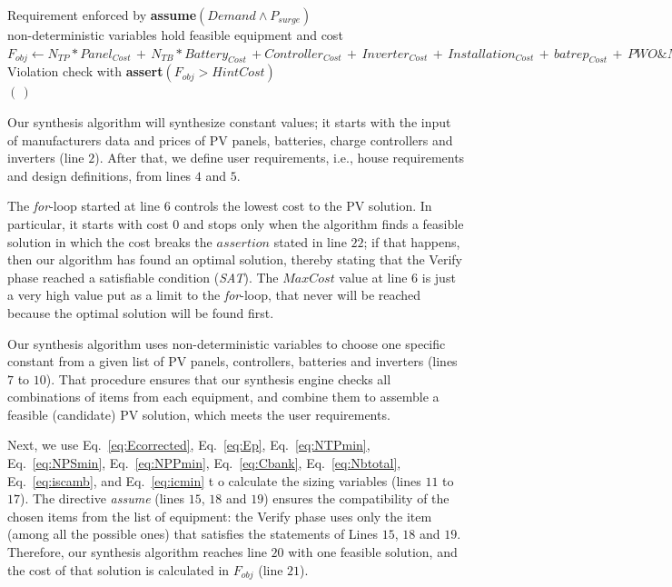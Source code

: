 \documentclass[review]{elsarticle}
\begin{document}
\begin{algorithm}
\begin{algorithmic}[1]
	\STATE Requirement enforced by \textbf{assume}$(Demand \wedge P_{surge})$ \\
	\STATE non-deterministic variables hold feasible equipment and cost  \\
	\STATE $F_{obj} \leftarrow  N_{TP}*Panel_{Cost} \, + \, N_{TB}*Battery_{Cost} \, + Controller_{Cost} \, + \, Inverter_{Cost} \, + \, Installation_{Cost} \, + \, batrep_{Cost} \, + \, PWO\&M_{Cost}$ \\
	\STATE Violation check with \textbf{assert}$(F_{obj} > HintCost)$ \\
  \ENDFOR
 \RETURN $(\,)$ 
 \end{algorithmic} 
 \label{alg:verification-algorithm}
 \end{algorithm}
%

Our synthesis algorithm will synthesize constant values; 
it starts with the input of manufacturers data and prices of PV panels, batteries, 
charge controllers and inverters (line $2$). After that, we define user requirements, i.e., 
house requirements and design definitions, from lines $4$ and $5$. 

The \textit{for}-loop started at line $6$ controls the lowest cost to the PV solution. 
In particular, it starts with cost $0$ and stops only when the algorithm finds a 
feasible solution in which the cost breaks the $assertion$ stated in line $22$; 
if that happens, then our algorithm has found an optimal solution, thereby stating 
that the {\sc Verify} phase reached a satisfiable condition (\textit{SAT}). 
The $MaxCost$ value at line $6$ is just a very high value put as a limit 
to the \textit{for}-loop, that never will be reached because the optimal solution will be found first.

Our synthesis algorithm uses non-deterministic variables to choose one specific constant 
from a given list of PV panels, controllers, batteries and inverters (lines $7$ to $10$). 
That procedure ensures that our synthesis engine checks all combinations of items 
from each equipment, and combine them to assemble a feasible (candidate) PV solution, 
which meets the user requirements.

Next, we use Eq.~\eqref{eq:Ecorrected}, Eq.~\eqref{eq:Ep}, Eq.~\eqref{eq:NTPmin}, 
Eq.~\eqref{eq:NPSmin}, Eq.~\eqref{eq:NPPmin}, Eq.~\eqref{eq:Cbank}, 
Eq.~\eqref{eq:Nbtotal}, Eq.~\eqref{eq:iscamb}, and Eq.~\eqref{eq:icmin} t
o calculate the sizing variables (lines $11$ to $17$). The directive \textit{assume} (lines $15$, $18$ and $19$) 
ensures the compatibility of the chosen items from the list of equipment: the {\sc Verify} phase 
uses only the item (among all the possible ones) that satisfies the statements of Lines $15$, $18$ and $19$. 
Therefore, our synthesis algorithm reaches line $20$ with one feasible solution, 
and the cost of that solution is calculated in $F_{obj}$ (line $21$). 
\end{document}
